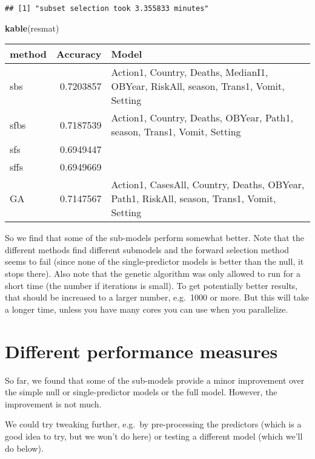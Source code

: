 \documentclass[]{article}
\newenvironment{Shaded}{\begin{snugshade}}{\end{snugshade}}
\newcommand{\KeywordTok}[1]{\textcolor[rgb]{0.13,0.29,0.53}{\textbf{#1}}}
\newcommand{\NormalTok}[1]{#1}
\begin{document}
\begin{verbatim}
## [1] "subset selection took 3.355833 minutes"
\end{verbatim}

\begin{Shaded}
\begin{Highlighting}[]
\KeywordTok{kable}\NormalTok{(resmat)}
\end{Highlighting}
\end{Shaded}

\begin{longtable}[]{@{}lrl@{}}
\toprule
method & Accuracy & Model\tabularnewline
\midrule
\endhead
sbs & 0.7203857 & Action1, Country, Deaths, MedianI1, OBYear, RiskAll,
season, Trans1, Vomit, Setting\tabularnewline
sfbs & 0.7187539 & Action1, Country, Deaths, OBYear, Path1, season,
Trans1, Vomit, Setting\tabularnewline
sfs & 0.6949447 &\tabularnewline
sffs & 0.6949669 &\tabularnewline
GA & 0.7147567 & Action1, CasesAll, Country, Deaths, OBYear, Path1,
RiskAll, season, Trans1, Vomit, Setting\tabularnewline
\bottomrule
\end{longtable}

So we find that some of the sub-models perform somewhat better. Note
that the different methods find different submodels and the forward
selection method seems to fail (since none of the single-predictor
models is better than the null, it stops there). Also note that the
genetic algorithm was only allowed to run for a short time (the number
if iterations is small). To get potentially better results, that should
be increased to a larger number, e.g.~1000 or more. But this will take a
longer time, unless you have many cores you can use when you
parallelize.

\hypertarget{different-performance-measures}{%
\section{Different performance
measures}\label{different-performance-measures}}

So far, we found that some of the sub-models provide a minor improvement
over the simple null or single-predictor models or the full model.
However, the improvement is not much.

We could try tweaking further, e.g.~by pre-processing the predictors
(which is a good idea to try, but we won't do here) or testing a
different model (which we'll do below).
\end{document}
